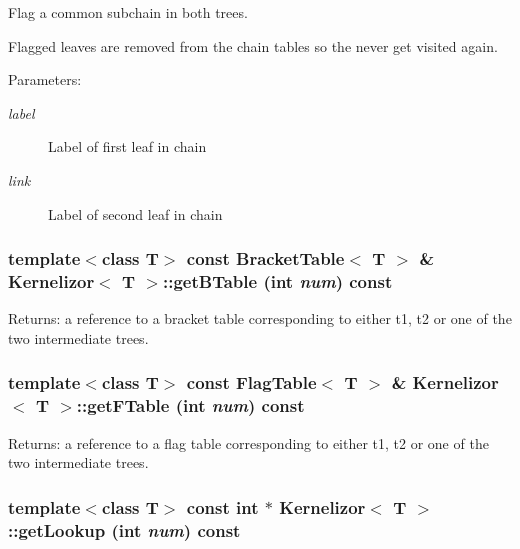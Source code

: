 Flag a common subchain in both trees. 

Flagged leaves are removed from the chain tables so the never get visited again. \begin{Desc}
\item[Parameters:]
\begin{description}
\item[{\em label}]Label of first leaf in chain \item[{\em link}]Label of second leaf in chain \end{description}
\end{Desc}
\subsubsection{\setlength{\rightskip}{0pt plus 5cm}template$<$class T$>$ const {\bf Bracket\-Table}$<$ T $>$ \& {\bf Kernelizor}$<$ T $>$::get\-BTable (int {\em num}) const\hspace{0.3cm}{\tt  [inline]}}\label{classKernelizor_a6}


\begin{Desc}
\item[Returns:]a reference to a bracket table corresponding to either t1, t2 or one of the two intermediate trees. \end{Desc}
\subsubsection{\setlength{\rightskip}{0pt plus 5cm}template$<$class T$>$ const {\bf Flag\-Table}$<$ T $>$ \& {\bf Kernelizor}$<$ T $>$::get\-FTable (int {\em num}) const\hspace{0.3cm}{\tt  [inline]}}\label{classKernelizor_a7}


\begin{Desc}
\item[Returns:]a reference to a flag table corresponding to either t1, t2 or one of the two intermediate trees. \end{Desc}
\subsubsection{\setlength{\rightskip}{0pt plus 5cm}template$<$class T$>$ const int $\ast$ {\bf Kernelizor}$<$ T $>$::get\-Lookup (int {\em num}) const\hspace{0.3cm}{\tt  [inline]}}\label{classKernelizor_a8}


